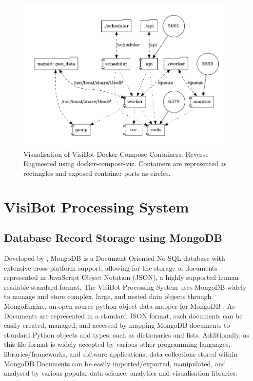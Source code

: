 \begin{figure}[!htb]
    \centering
    \includegraphics[width=0.75\linewidth]{graphs/docker-compose.png}
    \caption{Visualisation of VisiBot Docker-Compose Containers. Reverse Engineered using docker-compose-viz. Containers are represented as rectangles and exposed container ports as circles.}
    \label{fig:docker_graph} 
\end{figure}





\section{VisiBot Processing System}

\subsection{Database Record Storage using MongoDB}

Developed by \citet{MongoDB}, MongoDB is a Document-Oriented No-SQL database with extensive cross-platform support, allowing for the storage of documents represented in JavaScript Object Notation (JSON), a highly supported human-readable standard format. The VisiBot Processing System uses MongoDB widely to manage and store complex, large, and nested data objects through MongoEngine, an open-source python object data mapper for MongoDB \citep{MongoEngine}. As Documents are represented in a standard JSON format, such documents can be easily created, managed, and accessed by mapping MongoDB documents to standard Python objects and types, such as dictionaries and lists. Additionally, as this file format is widely accepted by various other programming languages, libraries/frameworks, and software applications, data collections stored within MongoDB Documents can be easily imported/exported, manipulated, and analysed by various popular data science, analytics and visualisation libraries.

